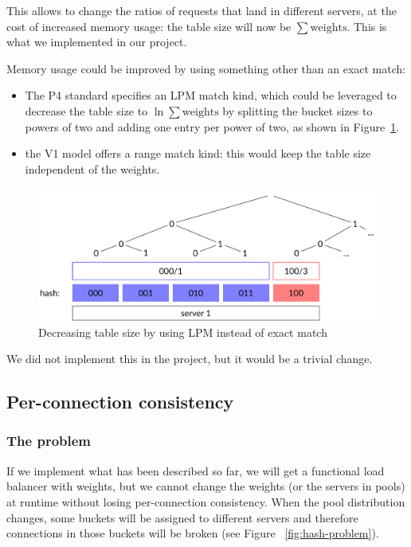\documentclass[11pt,oneside,a4paper]{article}
\begin{document}
This allows to change the ratios of requests that land in different servers, at
the cost of increased memory usage: the table size will now be
$\sum \mathrm{weights}$.
This is what we implemented in our project.

Memory usage could be improved by using something other than an exact match:

\begin{itemize}
\item The P4 standard specifies an LPM match kind, which could be leveraged to
    decrease the table size to $\ln \sum \textrm{weights}$ by splitting the
    bucket sizes to powers of two and adding one entry per power of two, as
    shown in Figure~\ref{fig:prefix-tree}.
\item the V1 model offers a range match kind: this would keep the table size
    independent of the weights.
\end{itemize}

\begin{figure}[ht]
\centering
\includegraphics[width=.7\textwidth]{figures/prefix-tree.pdf}
\caption{Decreasing table size by using LPM instead of exact match}
\label{fig:prefix-tree}
\end{figure}

We did not implement this in the project, but it would be a trivial change.

\subsection{Per-connection consistency}
\subsubsection{The problem}

If we implement what has been described so far, we will get a functional load
balancer with weights, but we cannot change the weights (or the servers in
pools) at runtime without losing per-connection consistency.
When the pool distribution changes, some buckets will be assigned to different
servers and therefore connections in those buckets will be broken (see Figure
~\ref{fig:hash-problem}).
\end{document}
